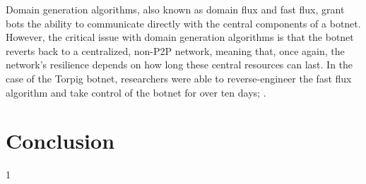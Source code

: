 \documentclass{acm_proc_article-sp}
\begin{document}
Domain generation algorithms, also known as domain flux and fast flux, grant bots the ability to communicate directly with the central components of a botnet.  However, the critical issue with domain generation algorithms is that the botnet reverts back to a centralized, non-P2P network, meaning that, once again, the network’s resilience depends on how long these central resources can last.  In the case of the Torpig botnet, researchers were able to reverse-engineer the fast flux algorithm and take control of the botnet for over ten days; \cite{stone:takeover}.



%
%
%
%


\section{Conclusion}


1


\printbibliography{}
\end{document}
